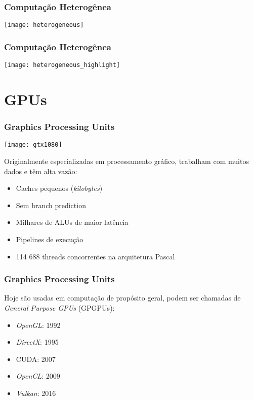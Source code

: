 \documentclass[10pt, compress, aspectratio=43, xcolor={table,usenames,dvipsnames}]{beamer}
\begin{document}
\begin{frame}
    \frametitle{Computação Heterogênea}
    \centering
    \texttt{[image: heterogeneous]}
\end{frame}

\begin{frame}
    \frametitle{Computação Heterogênea}
    \centering
    \texttt{[image: heterogeneous\_highlight]}
\end{frame}

\section{GPUs}

\begin{frame}
    \frametitle{Graphics Processing Units}
    \begin{center}
        \texttt{[image: gtx1080]}
    \end{center}

    Originalmente especializadas em \alert{processamento gráfico},
    trabalham com muitos dados e têm \alert{alta vazão}:

    \begin{itemize}
        \item Caches pequenos (\textit{kilobytes})
        \item Sem \alert{branch prediction}
        \item \alert{Milhares} de ALUs de \alert{maior latência}
        \item \alert{Pipelines} de execução
        \item 114 688 \alert{threads} concorrentes na arquitetura Pascal
    \end{itemize}
\end{frame}

\begin{frame}
    \frametitle{Graphics Processing Units}
    Hoje são usadas em computação de propósito geral, podem ser chamadas de
    \textit{General Purpose GPUs} (GPGPUs):
    \begin{itemize}
        \item \textit{OpenGL}: 1992
        \item \textit{DirectX}: 1995
        \item \alert{CUDA}: 2007
        \item \textit{OpenCL}: 2009
        \item \textit{Vulkan}: 2016
    \end{itemize}
\end{frame}
\end{document}

